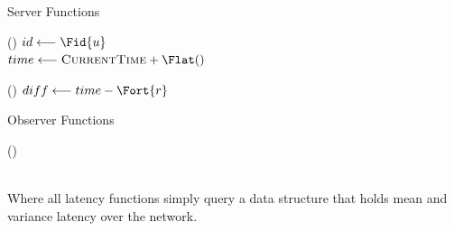 \documentclass[11pt,a4paper]{article}
\begin{document}
\begin{minipage}{9.6cm}
  {\Large{Server Functions}} \\
  \begin{algorithm}[H]
    \LinesNumbered
    \Fn(){}{
        $id \longleftarrow \Fid{u}$
         \\
        $time \longleftarrow \textsc{CurrentTime} + \Flat()$ \\
    }
  \end{algorithm}
  \begin{algorithm}[H]
    \LinesNumbered
    \Fn(){}{
        $diff \longleftarrow time - \Fort{r}$
    }
  \end{algorithm}
\end{minipage}
\begin{minipage}{12cm}
  {\Large{Observer Functions}} \\
  \begin{algorithm}[H]
    \LinesNumbered
    \Fn(){}{
       \\
    }
  \end{algorithm}
\end{minipage} \\
Where all latency functions simply query a data structure that holds mean and variance latency over the network.
\end{document}
